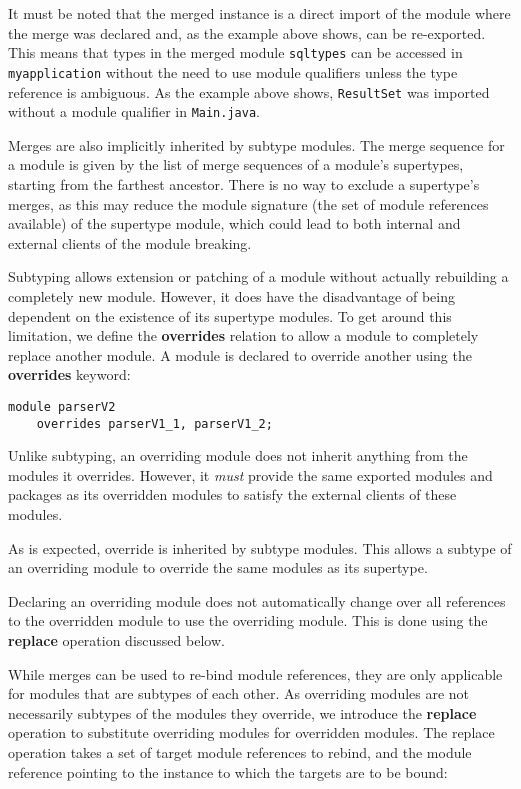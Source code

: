 It must be noted that the merged instance is a direct import of
the module where the merge was declared and, as the example above shows,
can be re-exported. This means that types in the merged module {\tt sqltypes} 
can be accessed in {\tt myapplication} without the need to use module 
qualifiers unless the type reference is ambiguous. As the example above
shows, {\tt ResultSet} was imported without a module qualifier in
{\tt Main.java}.

Merges are also implicitly inherited by subtype modules. The merge sequence for
a module is given by the list of merge sequences of a module's supertypes, starting
from the farthest ancestor. There is no way to exclude a supertype's merges, as
this may reduce the module signature (the set of module references available) of
the supertype module, which could lead to both internal and external clients of
the module breaking.


Subtyping allows extension or patching of a module without actually
rebuilding a completely new module. However, it does have the disadvantage
of being dependent on the existence of its supertype modules. To get
around this limitation, we define the \textbf{overrides} relation to allow
a module to completely replace another module. A module is declared
to override another using the \textbf{overrides} keyword:

\begin{lstlisting}
module parserV2 
	overrides parserV1_1, parserV1_2;
\end{lstlisting}

Unlike subtyping, an overriding module does not inherit anything from the
modules it overrides. However, it \textit{must} provide the same exported modules
and packages as its overridden modules to satisfy the external 
clients of these modules.

As is expected, override is inherited by subtype modules. This allows a subtype
of an overriding module to override the same modules as its supertype.

Declaring an overriding module does not automatically change over all references
to the overridden module to use the overriding module. This is done using the
\textbf{replace} operation discussed below.


While merges can be used to re-bind module references, they are only applicable 
for modules that are subtypes of each other. As overriding modules are not
necessarily subtypes of the modules they override, we introduce the \textbf{replace} operation
to substitute overriding modules for overridden modules. The replace operation
takes a set of target module references to rebind, and the module reference pointing to the 
instance to which the targets are to be bound:

